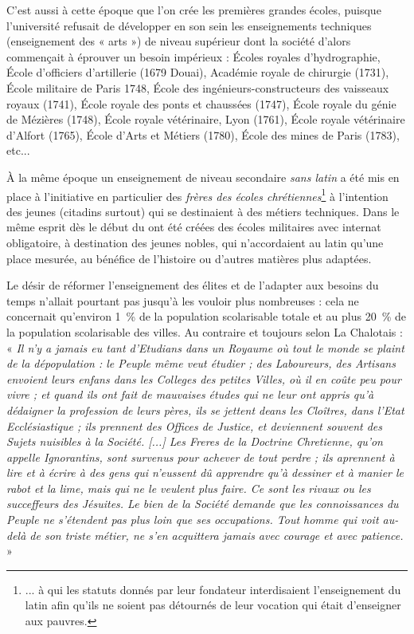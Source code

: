  C'est aussi à cette époque que l'on crée les premières grandes écoles, puisque l'université refusait de développer en son sein les enseignements techniques (enseignement des « arts ») de niveau supérieur dont la société d'alors commençait à éprouver un besoin impérieux : Écoles royales d'hydrographie, École d'officiers d'artillerie (1679 Douai), Académie royale de chirurgie (1731), École militaire de Paris 1748, École des ingénieurs-constructeurs des vaisseaux royaux (1741), École royale des ponts et chaussées (1747), École royale du génie de Mézières (1748), École royale vétérinaire, Lyon (1761), École royale vétérinaire d'Alfort (1765), École d'Arts et Métiers (1780), École des mines de Paris (1783), etc...
 
 À la même époque un enseignement de niveau secondaire \emph{sans latin} a été mis en place à l'initiative en particulier des \emph{frères des écoles chrétiennes}\footnote{... à qui les statuts donnés par leur fondateur interdisaient l'enseignement du latin afin qu'ils ne soient pas détournés de leur vocation qui était d'enseigner aux pauvres.} à l'intention des jeunes (citadins surtout) qui se destinaient à des métiers techniques. Dans le même esprit dès le début du  ont été créées des écoles militaires avec internat obligatoire, à destination des jeunes nobles, qui n'accordaient au latin qu'une place mesurée, au bénéfice de l'histoire ou d'autres matières plus adaptées. 



Le désir de réformer l'enseignement des élites  et de l'adapter aux besoins du temps n'allait pourtant pas jusqu'à les vouloir plus nombreuses : cela ne concernait qu'environ 1~\% de la population scolarisable totale et au plus 20~\% de la population scolarisable des villes. Au contraire et toujours selon La Chalotais : « \emph{Il n'y a jamais eu tant d'Etudians dans un Royaume où tout le monde se plaint de la dépopulation : le Peuple même veut étudier ; des Laboureurs, des Artisans envoient leurs enfans dans les Colleges des petites Villes, où il en coûte peu pour vivre ; et quand ils ont fait de mauvaises études qui ne leur ont appris qu'à dédaigner la profession de leurs pères, ils se jettent deans les Cloîtres, dans l'Etat Ecclésiastique ; ils prennent des Offices de Justice, et deviennent souvent des Sujets nuisibles à la Société. [...] Les Freres de la Doctrine Chretienne, qu'on appelle Ignorantins, sont survenus pour achever de tout perdre ; ils aprennent à lire et à écrire à des gens qui n'eussent dû apprendre qu'à dessiner et à manier le rabot et la lime, mais qui ne le veulent plus faire. Ce sont les rivaux ou les succeffeurs des Jésuites. Le bien de la Société demande que les connoissances du Peuple ne s'étendent pas plus loin que ses occupations. Tout homme qui voit au-delà de son triste métier, ne s'en acquittera jamais avec courage et avec patience.} »


